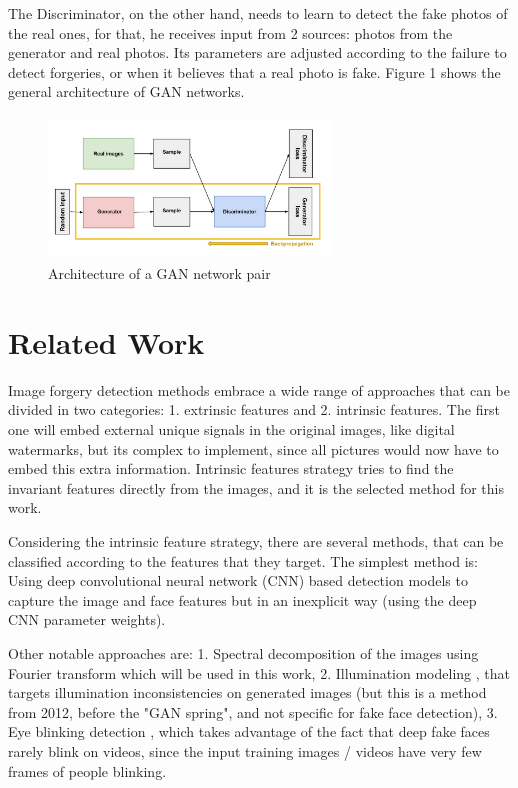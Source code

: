 \documentclass{bmvc2k}
\begin{document}
The Discriminator, on the other hand, needs to learn to detect the fake photos of the real ones, for that, he receives input from 2 sources: photos from the generator and real photos. Its parameters are adjusted according to the failure to detect forgeries, or when it believes that a real photo is fake. Figure 1 shows the general architecture of GAN networks.

\begin{figure}[!h]
\centering
\includegraphics[width=7.5cm, height=3.8cm]{GAN.png}
    \caption{Architecture of a GAN network pair}
\end{figure}

\section{Related Work}

Image forgery detection methods embrace a wide range of approaches that can be divided in two categories:
1. extrinsic features and 2. intrinsic features. The first one will embed external unique signals in the original images, like digital watermarks, but its complex to implement, since all pictures would now have to embed this extra information. Intrinsic features strategy tries to find the invariant features directly from the images, and it is the selected method for this work.

Considering the intrinsic feature strategy, there are several methods, that can be classified according to the features that they target. The simplest method is: Using deep convolutional neural network (CNN) based detection models to capture the image and face features but in an inexplicit way (using the deep CNN parameter weights). 

Other notable approaches are: 1. Spectral decomposition of the images using Fourier transform \cite{durall2019unmasking} which will be used in this work, 2. Illumination modeling \cite{journals/tifs/CarvalhoRAPR13}, that targets illumination inconsistencies on generated images (but this is a method from 2012, before the "GAN spring", and not specific for fake face detection), 3. Eye blinking detection \cite{journals/corr/abs-1806-02877}, which takes advantage of the fact that deep fake faces rarely blink on videos, since the input training images / videos have very few frames of people blinking.
\end{document}
